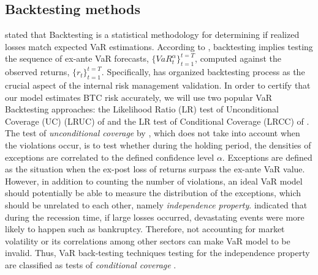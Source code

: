 \documentclass[12pt,a4paper]{article}
\begin{document}
\subsection{Backtesting methods}
\cite{philippe2001value} stated that Backtesting is a statistical methodology for determining if realized losses match expected VaR estimations. According to \cite{christoffersen2008backtesting}, backtesting implies testing the sequence of ex-ante VaR forecasts, $\{VaR^\alpha_t\}^{t=T}_{t=1}$, computed against the observed returns, $\{r_t\}^{t=T}_{t=1}$. Specifically, \cite{basel1996backtest} has organized backtesting process as the crucial aspect of the internal risk management validation. In order to certify that our model estimates BTC risk accurately, we will use two popular VaR Backtesting approaches: the Likelihood Ratio (LR) test of Unconditional Coverage (UC) (LRUC) of \cite{kupiec1995techniques} and the LR test of Conditional Coverage (LRCC) of \cite{christoffersen1998evaluating}. The test of \textit{unconditional coverage} by \cite{kupiec1995techniques}, which does not take into account when the violations occur, is to test whether during the holding period, the densities of exceptions are correlated to the defined confidence level $\alpha$. Exceptions are defined as the situation when the ex-post loss of returns surpass the ex-ante VaR value. However, in addition to counting the number of violations, an ideal VaR model should potentially be able to measure the distribution of the exceptions, which should be unrelated to each other, namely \textit{independence property}. \cite{christoffersen1998evaluating} indicated that during the recession time, if large losses occurred, devastating events were more likely to happen such as bankruptcy. Therefore, not accounting for market volatility or its correlations among other sectors can make VaR model to be invalid. Thus, VaR back-testing techniques testing for the independence property are classified as tests of \textit{conditional coverage} \citep{katsenga2013value}.\par
\end{document}
